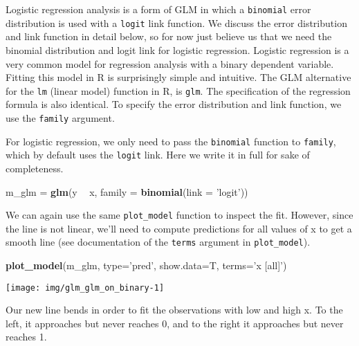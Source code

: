 \documentclass[
]{article}
\newenvironment{Shaded}{\begin{snugshade}}{\end{snugshade}}
\newcommand{\DataTypeTok}[1]{\textcolor[rgb]{0.13,0.29,0.53}{#1}}
\newcommand{\KeywordTok}[1]{\textcolor[rgb]{0.13,0.29,0.53}{\textbf{#1}}}
\newcommand{\NormalTok}[1]{#1}
\newcommand{\OperatorTok}[1]{\textcolor[rgb]{0.81,0.36,0.00}{\textbf{#1}}}
\newcommand{\StringTok}[1]{\textcolor[rgb]{0.31,0.60,0.02}{#1}}
\begin{document}
Logistic regression analysis is a form of GLM in which a
\texttt{binomial} error distribution is used with a \texttt{logit} link
function. We discuss the error distribution and link function in detail
below, so for now just believe us that we need the binomial distribution
and logit link for logistic regression. Logistic regression is a very
common model for regression analysis with a binary dependent variable.
Fitting this model in R is surprisingly simple and intuitive. The GLM
alternative for the \texttt{lm} (linear model) function in R, is
\texttt{glm}. The specification of the regression formula is also
identical. To specify the error distribution and link function, we use
the \texttt{family} argument.

For logistic regression, we only need to pass the \texttt{binomial}
function to \texttt{family}, which by default uses the \texttt{logit}
link. Here we write it in full for sake of completeness.

\begin{Shaded}
\begin{Highlighting}[]
\NormalTok{m_glm =}\StringTok{ }\KeywordTok{glm}\NormalTok{(y }\OperatorTok{~}\StringTok{ }\NormalTok{x, }\DataTypeTok{family =} \KeywordTok{binomial}\NormalTok{(}\DataTypeTok{link =} \StringTok{'logit'}\NormalTok{))}
\end{Highlighting}
\end{Shaded}

We can again use the same \texttt{plot\_model} function to inspect the
fit. However, since the line is not linear, we'll need to compute
predictions for all values of x to get a smooth line (see documentation
of the \texttt{terms} argument in \texttt{plot\_model}).

\begin{Shaded}
\begin{Highlighting}[]
\KeywordTok{plot_model}\NormalTok{(m_glm, }\DataTypeTok{type=}\StringTok{'pred'}\NormalTok{, }\DataTypeTok{show.data=}\NormalTok{T, }\DataTypeTok{terms=}\StringTok{'x [all]'}\NormalTok{)}
\end{Highlighting}
\end{Shaded}

\begin{center}\texttt{[image: img/glm\_glm\_on\_binary-1]} \end{center}

Our new line bends in order to fit the observations with low and high x.
To the left, it approaches but never reaches 0, and to the right it
approaches but never reaches 1.
\end{document}
